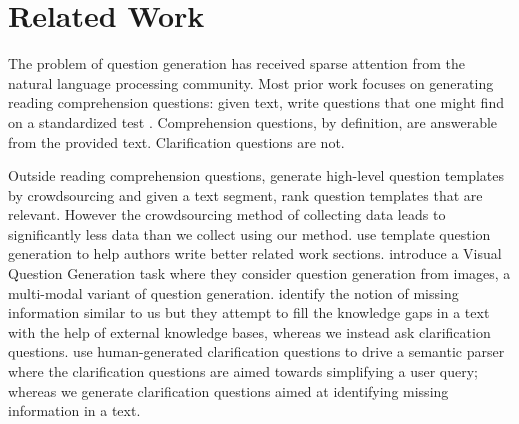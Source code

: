 \documentclass[11pt]{report}
\newcommand\newcite{\citet}
\begin{document}
\section{Related Work} \label{related_work}

The problem of question generation has received sparse attention from the natural language processing community. Most prior work focuses on generating reading comprehension questions:  given text, write questions that one might find on a standardized test \cite{vanderwende2008importance,heilman2011automatic,rus2011question,olney2012question}.  Comprehension questions, by definition, are answerable from the provided text. Clarification questions are not.  

Outside reading comprehension questions, \newcite{labutov2015deep} generate high-level question templates by crowdsourcing and given a text segment, rank question templates that are relevant. However the crowdsourcing method of collecting data leads to significantly less data than we collect using our method. \newcite{liu2010automatic} use template question generation to help authors write better related work sections. \newcite{mostafazadeh2016generating} introduce a Visual Question Generation task where they consider question generation from images, a multi-modal variant of question generation. 
\newcite{penas2010filling} identify the notion of missing information similar to us but they attempt to fill the knowledge gaps in a text with the help of external knowledge bases, whereas we instead ask clarification questions. \newcite{artzi2011bootstrapping} use human-generated clarification questions to drive a semantic parser where the clarification questions are aimed towards simplifying a user query; whereas we generate clarification questions aimed at  identifying missing information in a text. 

%
\end{document}
